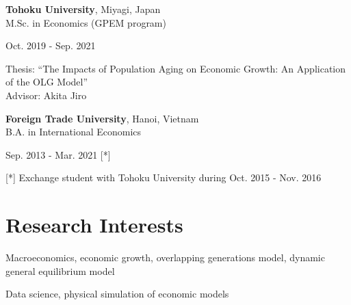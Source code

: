 \documentclass[a4paper,20pt]{article}
\begin{document}
	\begin{minipage}{.7\linewidth} \begin{flushleft}
			\textbf{Tohoku University}, Miyagi, Japan \\
			\hspace{4mm} M.Sc. in Economics (GPEM program)\\
	\end{flushleft} \end{minipage}
	\hfill 
	\begin{minipage}{.25\linewidth}\begin{flushright}
			Oct. 2019 - Sep. 2021 \\
	\end{flushright}\end{minipage}
	
	\vspace{2pt}
	\hspace{4mm} Thesis: ``The Impacts of Population Aging on Economic Growth: An Application of the OLG Model'' \\
	\hspace{4mm} Advisor: Akita Jiro
	\vspace{4pt}
	
	\begin{minipage}{.7\linewidth} \begin{flushleft}
			\textbf{Foreign Trade University}, Hanoi, Vietnam \\
			\hspace{4mm} B.A. in International Economics
	\end{flushleft} \end{minipage}
	\hfill 
	\begin{minipage}{.25\linewidth}\begin{flushright}
			Sep. 2013 - Mar. 2021 [*] \\
	\end{flushright}\end{minipage}
	
	\vspace{2pt}
	\hspace{4mm} [*] Exchange student with Tohoku University during Oct. 2015 - Nov. 2016
	\vspace{4pt}
	
	\section{Research Interests}
	\begin{description}
		\item Macroeconomics, economic growth, overlapping generations model, dynamic general equilibrium model \\
		\vspace{-5pt}
		\item Data science, physical simulation of economic models
	\end{description}
	\vspace{0pt}
\end{document}
